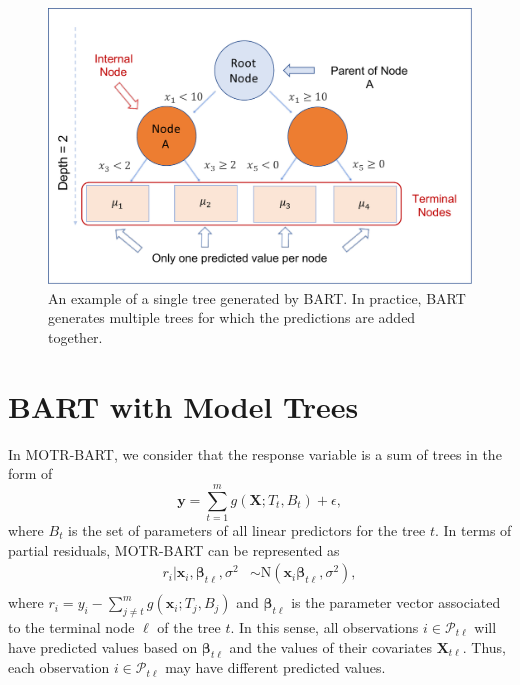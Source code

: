 \documentclass[
    ,title     = {{Bayesian Additive Regression Trees with Model Trees}}
    ,author    = {{Estevao B. Prado}}
    ,subject   = {{This is the subject of my work}}
   ,toplogo   = {{header_poster}}
,longtitle
]{dtuposter}
\begin{document}
\begin{dtupostercontent}
\begin{figure}
\includegraphics[width=.95\linewidth,origin=c]{Model_trees_plot1.pdf}
\caption{ \hspace{-2.18cm} An example of a single tree generated by BART. In practice, BART generates multiple trees for which the predictions are added together.}
\end{figure}


\section{BART with Model Trees}

In MOTR-BART, we consider that the response variable is a sum of trees in the form of
$$\textbf{y} = \sum_{t = 1}^{m} g(\textbf{X}; T_{t}, B_{t}) + \epsilon,$$
where $B_{t}$ is the set of parameters of all linear predictors for the tree $t$. In terms of partial residuals, MOTR-BART can be represented as 
$$
\begin{aligned}
r_{i}|\textbf{x}_{i}, \boldsymbol\beta_{t \ell}, \sigma^{2} & \sim \mbox{N}(\textbf{x}_{i} \boldsymbol\beta_{t \ell}, \sigma^{2}), \\
\end{aligned}
$$
\noindent
where $r_{i} = y_{i} - \sum_{j \neq t}^{m} g(\textbf{x}_{i}; T_{j}, B_{j})$ and $\boldsymbol\beta_{t \ell}$ is the parameter vector associated to the terminal node $\ell$ of the tree $t$. In this sense, all observations $i \in \mathcal{P}_{t \ell}$ will have predicted values based on $\boldsymbol\beta_{t \ell}$ and the values of their covariates $\textbf{X}_{t \ell}$. Thus, each observation $i \in \mathcal{P}_{t \ell}$ may have different predicted values.


\end{dtupostercontent}
\end{document}
